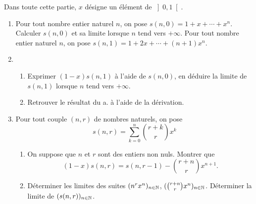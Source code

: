Dans toute cette partie, $x$ d{\'e}signe un {\'e}l{\'e}ment de $\left]
0,1\right[ $.

\begin{enumerate}
\item  Pour tout nombre entier naturel $n$, on pose $s(n,0)=1+x+\cdots
+x^{n}$. Calculer $s(n,0)$ et sa limite lorsque $n$ tend vers
$+\infty $.
\newline Pour tout nombre entier naturel $n$, on pose
$s(n,1)=1+2x+\cdots +(n+1)x^{n}$.

\item \begin{enumerate}
\item  Exprimer $(1-x)s(n,1)$ {\`a} l'aide de $s(n,0)$, en d{\'e}duire la
limite de $s(n,1)$ lorsque $n$ tend vers $+\infty $.

\item  Retrouver le r{\'e}sultat du a. {\`a} l'aide de la d{\'e}rivation.
\end{enumerate}
\item  Pour tout couple $(n,r)$ de nombres naturels, on pose
\[s(n,r)=\sum_{k=0}^{n}\binom{r+k}{r}x^{k}\]

\begin{enumerate}\item  On suppose que $n$ et $r$ sont des entiers non nuls.
Montrer que
\[
(1-x)s(n,r)=s(n,r-1)-\binom{r+n}{r}x^{n+1}\text{.}
\]

\item  D{\'e}terminer les limites des suites $(n^{r}x^{n})_{n\in \Bbb{N}}
$, $(\binom{r+n}{r}x^{n})_{n\in \Bbb{N}}$. D{\'e}terminer la limite de $%
(s(n,r))_{n\in \Bbb{N}}$.

\end{enumerate}
\end{enumerate}
